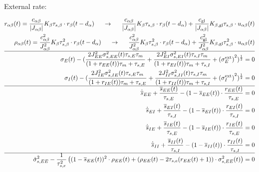 \documentclass[]{article}
\begin{document}
External rate:

\begin{footnotesize}
\begin{align}
	r_{\alpha \beta} (t) = \frac{c_{\alpha \beta}}{|J_{\alpha \beta}|} K_\beta \tau_{s, \beta} \cdot r_\beta (t-d_\alpha) \hspace{5mm} \rightarrow \hspace{5mm} \frac{c_{\alpha \beta}}{|J_{\alpha \beta}|} K_\beta \tau_{s, \beta} \cdot r_\beta (t-d_\alpha) + \frac{c_\text{gl}}{|J_{\alpha \beta}|} K_{\beta, \text{gl}} \tau_{s,\beta} \cdot u_{\alpha\beta}(t) \\
	\rho_{\alpha \beta} (t) = \frac{c_{\alpha \beta}^2}{J_{\alpha \beta}^2} K_\beta \tau_{s,\beta}^2 \cdot r_\beta (t-d_\alpha) \hspace{5mm} \rightarrow \hspace{5mm} \frac{c_{\alpha \beta}^2}{J_{\alpha \beta}^2} K_\beta \tau_{s,\beta}^2 \cdot r_\beta (t-d_\alpha) + \frac{c_\text{gl}^2}{J_{\alpha \beta}^2} K_{\beta, \text{gl}} \tau_{s,\beta}^2 \cdot u_{\alpha\beta}(t) \\
	\hline
	\sigma_E(t) - (\frac{2 J_{EE}^2 \sigma_{s,EE}^2(t) \tau_{s,E} \tau_m}{(1+ r_{EE} (t) ) \tau_m + \tau_{s,E}} + \frac{2 J_{EI}^2 \sigma_{s,EI}^2(t) \tau_{s,I} \tau_m}{(1+r_{EI} (t)) \tau_m + \tau_{s,I}} + {(\sigma_E^\text{ext})}^2)^{\frac{1}{2}} =0 \\
	\sigma_I(t) - (\frac{2 J_{IE}^2 \sigma_{s,IE}^2(t) \tau_{s,E} \tau_m}{(1+r_{IE}(t)) \tau_m + \tau_{s,E}} + \frac{2 J_{II}^2 \sigma_{s,II}^2(t) \tau_{s,I} \tau_m}{(1+r_{II}(t)) \tau_m + \tau_{s,I}} + {(\sigma_I^\text{ext})}^2)^{\frac{1}{2}} =0 \\
	\hline
	\dot{\overline{s}}_{EE} + \frac{\overline{s}_{EE}(t)}{\tau_{s,E}} - (1 - \overline{s}_{EE}(t)) \cdot \frac{r_{EE}(t)}{\tau_{s,E}} =0 \\
	\dot{\overline{s}}_{EI} + \frac{\overline{s}_{EI}(t)}{\tau_{s,I}} - (1 - \overline{s}_{EI}(t)) \cdot \frac{r_{EI}(t)}{\tau_{s,I}} =0 \\
	\dot{\overline{s}}_{IE} + \frac{\overline{s}_{IE}(t)}{\tau_{s,E}} - (1 - \overline{s}_{IE}(t)) \cdot \frac{r_{IE}(t)}{\tau_{s,E}} =0 \\
	\dot{\overline{s}}_{II} + \frac{\overline{s}_{II}(t)}{\tau_{s,I}} - (1 - \overline{s}_{II}(t)) \cdot \frac{r_{II}(t)}{\tau_{s,I}} =0 \\
	\hline
	\dot{\sigma}_{s,EE}^2 - \frac{1}{\tau_{s, e}^2} \left( (1 - \overline{s}_{EE}(t))^2 \cdot \rho_{EE} (t) + (\rho_{EE} (t) - 2 \tau_{s, e} (r_{EE} (t) + 1))\cdot \sigma_{s,EE}^2(t) \right)  =0 \\

\end{align}
\end{footnotesize}
\end{document}
